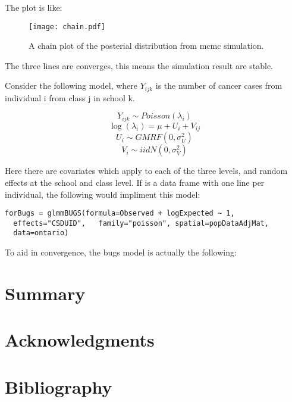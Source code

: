 \documentclass{article}
\begin{document}
The plot is like: 

\begin{figure}[ht]
\begin{center}
\texttt{[image: chain.pdf]}
\caption{A chain plot of the posterial distribution from mcmc simulation.}\label{singleellipse}
\end{center}
\end{figure}

The three lines are converges, this means the simulation result are stable. 







Consider the following model, where $Y_{ijk}$ is the number of cancer cases from individual i from class j in school k.  

\[Y_{ijk} \sim  Poisson(\lambda_i)\]
\[\log(\lambda_i) = \mu + U_i + V_{ij}\]
\[U_i \sim GMRF(0, \sigma_U^2)\]
\[V_{i} \sim iid N(0, \sigma_V^2)\] 

Here there are covariates which apply to each of the three levels, and random effects at the school and class level. 
If  is a data frame with one line per individual, the following would impliment this model: 
\begin{verbatim}
forBugs = glmmBUGS(formula=Observed + logExpected ~ 1,
  effects="CSDUID",   family="poisson", spatial=popDataAdjMat,
  data=ontario)
\end{verbatim}
To aid in convergence, the bugs model is actually the following:






\section{Summary}

\section{Acknowledgments}


\section{Bibliography}
\end{document}
